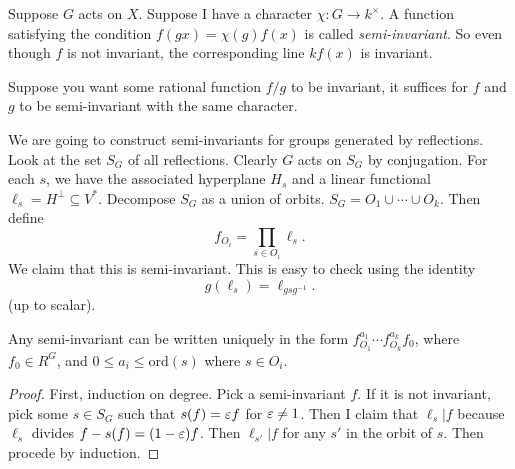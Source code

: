 
Suppose $G$ acts on $X$. Suppose I have a character $\chi\colon G\to k^\times$. A function satisfying the condition $f(gx)=\chi(g)f(x)$ is called \emph{semi-invariant}. So even though $f$ is not invariant, the corresponding line $kf(x)$ is invariant.

Suppose you want some rational function $f/g$ to be invariant, it suffices for $f$ and $g$ to be semi-invariant with the same character.

We are going to construct semi-invariants for groups generated by reflections. Look at the set $S_G$ of all reflections. Clearly $G$ acts on $S_G$ by conjugation. For each $s$, we have the associated hyperplane $H_s$ and a linear functional $\ell_s=H^\perp\subseteq V^*$. Decompose $S_G$ as a union of orbits. $S_G=O_1\cup \cdots \cup O_k$. Then define
\[
 f_{O_i}=\prod_{s\in O_i} \ell_s.
\]
We claim that this is semi-invariant. This is easy to check using the identity
\[
 g(\ell_s)= \ell_{gsg^{-1}}.
\]
(up to scalar).
\begin{proposition}
 Any semi-invariant can be written uniquely in the form $f_{O_1}^{a_1}\cdots f_{O_k}^{a_k}f_0$, where $f_0\in R^G$, and $0\le a_i\le \mathrm{ord}(s)$ where $s\in O_i$.
\end{proposition}
\begin{proof}
 First, induction on degree. Pick a semi-invariant $f$. If it is not invariant, pick some $s\in S_G$ such that $s(f)=\varepsilon f$ for $\varepsilon\neq 1$. Then I claim that $\ell_s|f$ because $\ell_s$ divides $f-s(f)=(1-\varepsilon)f$. Then $\ell_{s'}|f$ for any $s'$ in the orbit of $s$. Then procede by induction.
\end{proof}









